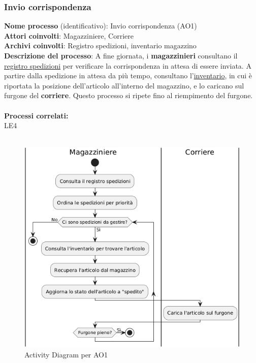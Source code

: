 \documentclass[a4paper,12pt]{article}
\begin{document}
\subsubsection{Invio corrispondenza}
\textbf{Nome processo} (identificativo): Invio corrispondenza (AO1) \\
\textbf{Attori coinvolti}: Magazziniere, Corriere \\
\textbf{Archivi coinvolti}: Registro spedizioni, inventario magazzino \\
\textbf{Descrizione del processo}: A fine giornata, i \textbf{magazzinieri} consultano il \underline{registro spedizioni} per verificare la corrispondenza
in attesa di essere inviata. A partire dalla spedizione in attesa da più tempo, consultano l'\underline{inventario}, in cui è riportata la posizione dell'articolo
all'interno del magazzino, e lo caricano sul furgone del \textbf{corriere}. Questo processo si ripete fino al riempimento del furgone. \\ \\
\textbf{Processi correlati:}\\LE4\\ \\
\begin{figure}[H]
  \centering
  \includegraphics[width=0.8\linewidth]{assets/activitydiagram_AO1.png}
	\caption{Activity Diagram per AO1}
\end{figure}
\end{document}
